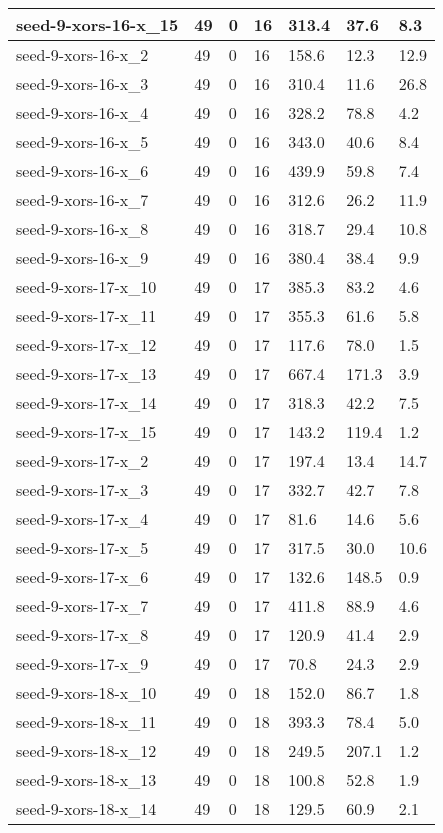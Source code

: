 \begin{scriptsize}
\begin{longtable}{|p{5cm}|l|l|l|l|l|l|}
seed-9-xors-16-x\_15&49&0&16&313.4&37.6&8.3 \\ \hline 
seed-9-xors-16-x\_2&49&0&16&158.6&12.3&12.9 \\ \hline 
seed-9-xors-16-x\_3&49&0&16&310.4&11.6&26.8 \\ \hline 
seed-9-xors-16-x\_4&49&0&16&328.2&78.8&4.2 \\ \hline 
seed-9-xors-16-x\_5&49&0&16&343.0&40.6&8.4 \\ \hline 
seed-9-xors-16-x\_6&49&0&16&439.9&59.8&7.4 \\ \hline 
seed-9-xors-16-x\_7&49&0&16&312.6&26.2&11.9 \\ \hline 
seed-9-xors-16-x\_8&49&0&16&318.7&29.4&10.8 \\ \hline 
seed-9-xors-16-x\_9&49&0&16&380.4&38.4&9.9 \\ \hline 
seed-9-xors-17-x\_10&49&0&17&385.3&83.2&4.6 \\ \hline 
seed-9-xors-17-x\_11&49&0&17&355.3&61.6&5.8 \\ \hline 
seed-9-xors-17-x\_12&49&0&17&117.6&78.0&1.5 \\ \hline 
seed-9-xors-17-x\_13&49&0&17&667.4&171.3&3.9 \\ \hline 
seed-9-xors-17-x\_14&49&0&17&318.3&42.2&7.5 \\ \hline 
seed-9-xors-17-x\_15&49&0&17&143.2&119.4&1.2 \\ \hline 
seed-9-xors-17-x\_2&49&0&17&197.4&13.4&14.7 \\ \hline 
seed-9-xors-17-x\_3&49&0&17&332.7&42.7&7.8 \\ \hline 
seed-9-xors-17-x\_4&49&0&17&81.6&14.6&5.6 \\ \hline 
seed-9-xors-17-x\_5&49&0&17&317.5&30.0&10.6 \\ \hline 
seed-9-xors-17-x\_6&49&0&17&132.6&148.5&0.9 \\ \hline 
seed-9-xors-17-x\_7&49&0&17&411.8&88.9&4.6 \\ \hline 
seed-9-xors-17-x\_8&49&0&17&120.9&41.4&2.9 \\ \hline 
seed-9-xors-17-x\_9&49&0&17&70.8&24.3&2.9 \\ \hline 
seed-9-xors-18-x\_10&49&0&18&152.0&86.7&1.8 \\ \hline 
seed-9-xors-18-x\_11&49&0&18&393.3&78.4&5.0 \\ \hline 
seed-9-xors-18-x\_12&49&0&18&249.5&207.1&1.2 \\ \hline 
seed-9-xors-18-x\_13&49&0&18&100.8&52.8&1.9 \\ \hline 
seed-9-xors-18-x\_14&49&0&18&129.5&60.9&2.1 \\ \hline 

\end{longtable}
\end{scriptsize}

